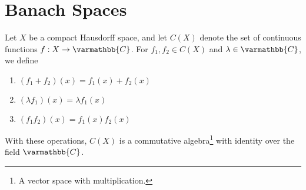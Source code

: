 \documentclass[10pt]{extarticle}
\newcommand{\C}{\mathbb{C}}
\theoremstyle{plain}
\theoremstyle{definition}
\theoremstyle{note}
\renewcommand*{\mathbb}[1]{\varmathbb{#1}}
\renewcommand{\newline}{\hfill\break}
\begin{document}
\section{Banach Spaces}%
Let $X$ be a compact Hausdorff space, and let $C(X)$ denote the set of continuous functions $f: X\rightarrow \C$. For $f_1,f_2\in C(X)$ and $\lambda\in \C$, we define
\begin{enumerate}[(1)]
  \item $\displaystyle \left(f_1 + f_2\right)(x) = f_1(x) + f_2(x)$
  \item $\displaystyle \left(\lambda f_1\right)(x) = \lambda f_1(x)$
  \item $\displaystyle \left(f_1f_2\right)(x) = f_1(x)f_2(x)$
\end{enumerate}
With these operations, $C(X)$ is a commutative algebra\footnote{A vector space with multiplication.} with identity over the field $\C$.\newline
\end{document}
